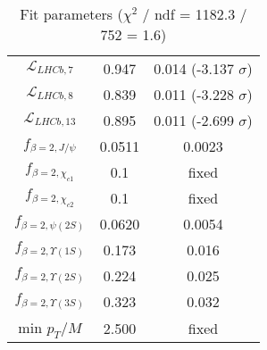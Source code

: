\begin{table}[h!]
\begin{tabular}{c|c|c}
$\mathcal L_{LHCb,7}$ & 0.947 & 0.014 (-3.137 $\sigma$) \\
$\mathcal L_{LHCb,8}$ & 0.839 & 0.011 (-3.228 $\sigma$) \\
$\mathcal L_{LHCb,13}$ & 0.895 & 0.011 (-2.699 $\sigma$) \\
$f_{\beta=2,J/\psi}$ & 0.0511 & 0.0023 \\
$f_{\beta=2,\chi_{c1}}$ & 0.1 & fixed \\
$f_{\beta=2,\chi_{c2}}$ & 0.1 & fixed \\
$f_{\beta=2,\psi(2S)}$ & 0.0620 & 0.0054 \\
$f_{\beta=2,\Upsilon(1S)}$ & 0.173 & 0.016 \\
$f_{\beta=2,\Upsilon(2S)}$ & 0.224 & 0.025 \\
$f_{\beta=2,\Upsilon(3S)}$ & 0.323 & 0.032 \\
min $p_T/M$ & 2.500 & fixed \\
\end{tabular}
\caption{Fit parameters ($\chi^2$ / ndf = 1182.3 / 752 = 1.6)}
\end{table}
